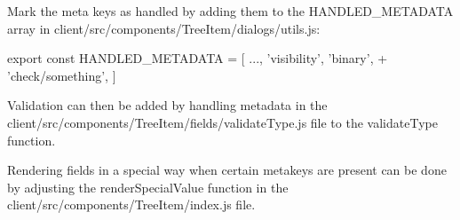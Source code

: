\begin{DoxyItemize}
\item Mark the meta keys as handled by adding them to the {\ttfamily H\+A\+N\+D\+L\+E\+D\+\_\+\+M\+E\+T\+A\+D\+A\+TA} array in {\ttfamily client/src/components/\+Tree\+Item/dialogs/utils.\+js}\+:
\end{DoxyItemize}


\begin{DoxyCode}
export const HANDLED\_METADATA = [
  ...,
  'visibility',
  'binary',
+ 'check/something',
]
\end{DoxyCode}



\begin{DoxyItemize}
\item Validation can then be added by handling metadata in the {\ttfamily client/src/components/\+Tree\+Item/fields/validate\+Type.\+js} file to the {\ttfamily validate\+Type} function.
\item Rendering fields in a special way when certain metakeys are present can be done by adjusting the {\ttfamily render\+Special\+Value} function in the {\ttfamily client/src/components/\+Tree\+Item/index.\+js} file. 
\end{DoxyItemize}